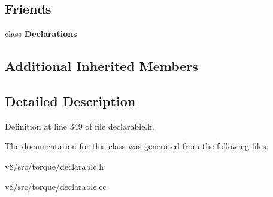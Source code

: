 \subsection*{Friends}
\begin{DoxyCompactItemize}
\item 
\mbox{\label{classv8_1_1internal_1_1torque_1_1Generic_a23135931a5f054329315374b774718cf}} 
class {\bfseries Declarations}
\end{DoxyCompactItemize}
\subsection*{Additional Inherited Members}


\subsection{Detailed Description}


Definition at line 349 of file declarable.\+h.



The documentation for this class was generated from the following files\+:\begin{DoxyCompactItemize}
\item 
v8/src/torque/declarable.\+h\item 
v8/src/torque/declarable.\+cc\end{DoxyCompactItemize}
